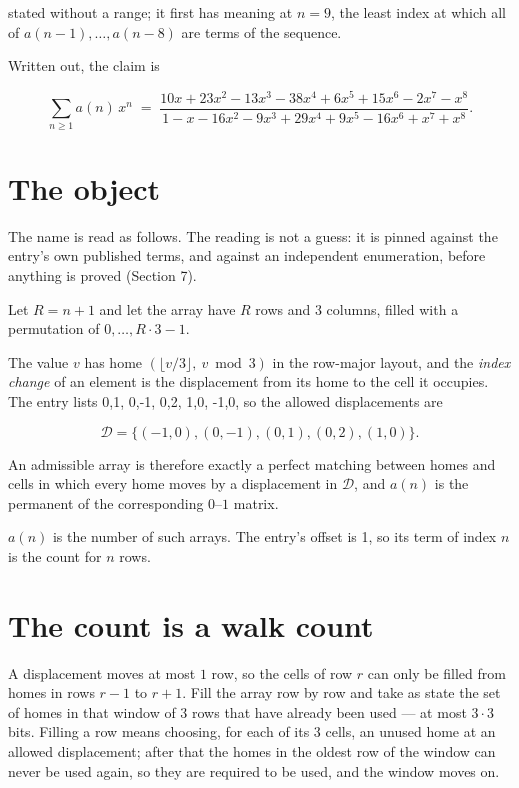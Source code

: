 \documentclass[11pt]{article}
\theoremstyle{definition}
\begin{document}
stated without a range; it first has meaning at $n = 9$, the least index at which all of $a(n-1),\dots,a(n-8)$ are terms of the sequence.

Written out, the claim is

\[\sum_{n \ge 1} a(n)\,x^n \;=\; \frac{10x + 23x^{2} - 13x^{3} - 38x^{4} + 6x^{5} + 15x^{6} - 2x^{7} - x^{8}}{1 - x - 16x^{2} - 9x^{3} + 29x^{4} + 9x^{5} - 16x^{6} + x^{7} + x^{8}}.\]

\section{The object}

The name is read as follows. The reading is not a guess: it is pinned against the entry's own published terms, and against an independent enumeration, before anything is proved (Section 7).

Let $R = n + 1$ and let the array have $R$ rows and $3$ columns, filled with a permutation of $0,\dots,R\cdot3-1$.

The value $v$ has home $(\lfloor v/3\rfloor,\ v \bmod 3)$ in the row-major layout, and the {\itshape index change} of an element is the displacement from its home to the cell it occupies. The entry lists 0,1, 0,-1, 0,2, 1,0, -1,0, so the allowed displacements are

\[\mathcal{D} = \{(-1,0), (0,-1), (0,1), (0,2), (1,0)\}.\]

An admissible array is therefore exactly a perfect matching between homes and cells in which every home moves by a displacement in $\mathcal{D}$, and $a(n)$ is the permanent of the corresponding $0$--$1$ matrix.

$a(n)$ is the number of such arrays. The entry's offset is 1, so its term of index $n$ is the count for $n$ rows.

\section{The count is a walk count}

A displacement moves at most $1$ row, so the cells of row $r$ can only be filled from homes in rows $r-1$ to $r+1$. Fill the array row by row and take as state the set of homes in that window of $3$ rows that have already been used --- at most $3\cdot3$ bits. Filling a row means choosing, for each of its $3$ cells, an unused home at an allowed displacement; after that the homes in the oldest row of the window can never be used again, so they are required to be used, and the window moves on.
\end{document}

